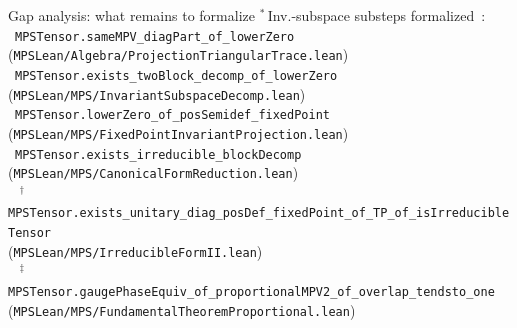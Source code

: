 \documentclass[aspectratio=169,10pt]{beamer}
\begin{document}
\begin{frame}{Gap analysis: what remains to formalize}
    \vspace{0.15em}
    {\footnotesize\textcolor{leangreen}{%
        $^*$\,Inv.-subspace substeps formalized~\cite{Cirac2017Annals,Perez-Garcia2007Matrix}:\\
        \textcolor{leangreen}{\checkmark}~\texttt{MPSTensor.sameMPV\_diagPart\_of\_lowerZero}
          (\texttt{MPSLean/Algebra/ProjectionTriangularTrace.lean})\\
        \textcolor{leangreen}{\checkmark}~\texttt{MPSTensor.exists\_twoBlock\_decomp\_of\_lowerZero}
          (\texttt{MPSLean/MPS/InvariantSubspaceDecomp.lean})\\[0.15em]
        \textcolor{leangreen}{\checkmark}~\texttt{MPSTensor.lowerZero\_of\_posSemidef\_fixedPoint}
          (\texttt{MPSLean/MPS/FixedPointInvariantProjection.lean})\\[0.15em]
        \textcolor{leangreen}{\checkmark}~\texttt{MPSTensor.exists\_irreducible\_blockDecomp}
          (\texttt{MPSLean/MPS/CanonicalFormReduction.lean})~\cite{Cirac2017Annals,Cirac2017Irreducible}\\[0.15em]
        \textcolor{leangreen}{\checkmark}~%
          $^{\dagger}$\,\texttt{MPSTensor.exists\_unitary\_diag\_posDef\_fixedPoint\_of\_TP\_of\_isIrreducibleTensor}\\
          \quad(\texttt{MPSLean/MPS/IrreducibleFormII.lean})~\cite{Cirac2017Annals,Cirac2017Irreducible}\\[0.15em]
        \textcolor{leangreen}{\checkmark}~%
          $^{\ddagger}$\,\texttt{MPSTensor.gaugePhaseEquiv\_of\_proportionalMPV2\_of\_overlap\_tendsto\_one}\\
          \quad(\texttt{MPSLean/MPS/FundamentalTheoremProportional.lean})~\cite{Cirac2021Matrix}\\[0.15em]
}}
\end{frame}
\end{document}
